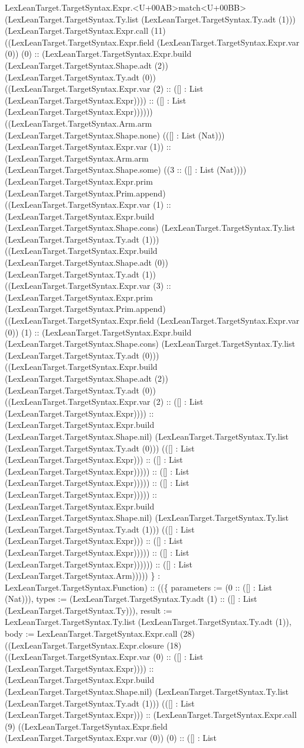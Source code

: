 \documentclass[11pt]{article}
\begin{document}
LexLeanTarget.TargetSyntax.Expr.<U+00AB>match<U+00BB> (LexLeanTarget.TargetSyntax.Ty.list (LexLeanTarget.TargetSyntax.Ty.adt (1))) (LexLeanTarget.TargetSyntax.Expr.call (11) ((LexLeanTarget.TargetSyntax.Expr.field (LexLeanTarget.TargetSyntax.Expr.var (0)) (0) :: (LexLeanTarget.TargetSyntax.Expr.build (LexLeanTarget.TargetSyntax.Shape.adt (2)) (LexLeanTarget.TargetSyntax.Ty.adt (0)) ((LexLeanTarget.TargetSyntax.Expr.var (2) :: ([] : List (LexLeanTarget.TargetSyntax.Expr)))) :: ([] : List (LexLeanTarget.TargetSyntax.Expr)))))) ((LexLeanTarget.TargetSyntax.Arm.arm (LexLeanTarget.TargetSyntax.Shape.none) (([] : List (Nat))) (LexLeanTarget.TargetSyntax.Expr.var (1)) :: (LexLeanTarget.TargetSyntax.Arm.arm (LexLeanTarget.TargetSyntax.Shape.some) ((3 :: ([] : List (Nat)))) (LexLeanTarget.TargetSyntax.Expr.prim (LexLeanTarget.TargetSyntax.Prim.append) ((LexLeanTarget.TargetSyntax.Expr.var (1) :: (LexLeanTarget.TargetSyntax.Expr.build (LexLeanTarget.TargetSyntax.Shape.cons) (LexLeanTarget.TargetSyntax.Ty.list (LexLeanTarget.TargetSyntax.Ty.adt (1))) ((LexLeanTarget.TargetSyntax.Expr.build (LexLeanTarget.TargetSyntax.Shape.adt (0)) (LexLeanTarget.TargetSyntax.Ty.adt (1)) ((LexLeanTarget.TargetSyntax.Expr.var (3) :: (LexLeanTarget.TargetSyntax.Expr.prim (LexLeanTarget.TargetSyntax.Prim.append) ((LexLeanTarget.TargetSyntax.Expr.field (LexLeanTarget.TargetSyntax.Expr.var (0)) (1) :: (LexLeanTarget.TargetSyntax.Expr.build (LexLeanTarget.TargetSyntax.Shape.cons) (LexLeanTarget.TargetSyntax.Ty.list (LexLeanTarget.TargetSyntax.Ty.adt (0))) ((LexLeanTarget.TargetSyntax.Expr.build (LexLeanTarget.TargetSyntax.Shape.adt (2)) (LexLeanTarget.TargetSyntax.Ty.adt (0)) ((LexLeanTarget.TargetSyntax.Expr.var (2) :: ([] : List (LexLeanTarget.TargetSyntax.Expr)))) :: (LexLeanTarget.TargetSyntax.Expr.build (LexLeanTarget.TargetSyntax.Shape.nil) (LexLeanTarget.TargetSyntax.Ty.list (LexLeanTarget.TargetSyntax.Ty.adt (0))) (([] : List (LexLeanTarget.TargetSyntax.Expr))) :: ([] : List (LexLeanTarget.TargetSyntax.Expr))))) :: ([] : List (LexLeanTarget.TargetSyntax.Expr))))) :: ([] : List (LexLeanTarget.TargetSyntax.Expr))))) :: (LexLeanTarget.TargetSyntax.Expr.build (LexLeanTarget.TargetSyntax.Shape.nil) (LexLeanTarget.TargetSyntax.Ty.list (LexLeanTarget.TargetSyntax.Ty.adt (1))) (([] : List (LexLeanTarget.TargetSyntax.Expr))) :: ([] : List (LexLeanTarget.TargetSyntax.Expr))))) :: ([] : List (LexLeanTarget.TargetSyntax.Expr)))))) :: ([] : List (LexLeanTarget.TargetSyntax.Arm))))) \} : LexLeanTarget.TargetSyntax.Function) :: ((\{ parameters := (0 :: ([] : List (Nat))), types := (LexLeanTarget.TargetSyntax.Ty.adt (1) :: ([] : List (LexLeanTarget.TargetSyntax.Ty))), result := LexLeanTarget.TargetSyntax.Ty.list (LexLeanTarget.TargetSyntax.Ty.adt (1)), body := LexLeanTarget.TargetSyntax.Expr.call (28) ((LexLeanTarget.TargetSyntax.Expr.closure (18) ((LexLeanTarget.TargetSyntax.Expr.var (0) :: ([] : List (LexLeanTarget.TargetSyntax.Expr)))) :: (LexLeanTarget.TargetSyntax.Expr.build (LexLeanTarget.TargetSyntax.Shape.nil) (LexLeanTarget.TargetSyntax.Ty.list (LexLeanTarget.TargetSyntax.Ty.adt (1))) (([] : List (LexLeanTarget.TargetSyntax.Expr))) :: (LexLeanTarget.TargetSyntax.Expr.call (9) ((LexLeanTarget.TargetSyntax.Expr.field (LexLeanTarget.TargetSyntax.Expr.var (0)) (0) :: ([] : List 
\end{document}
